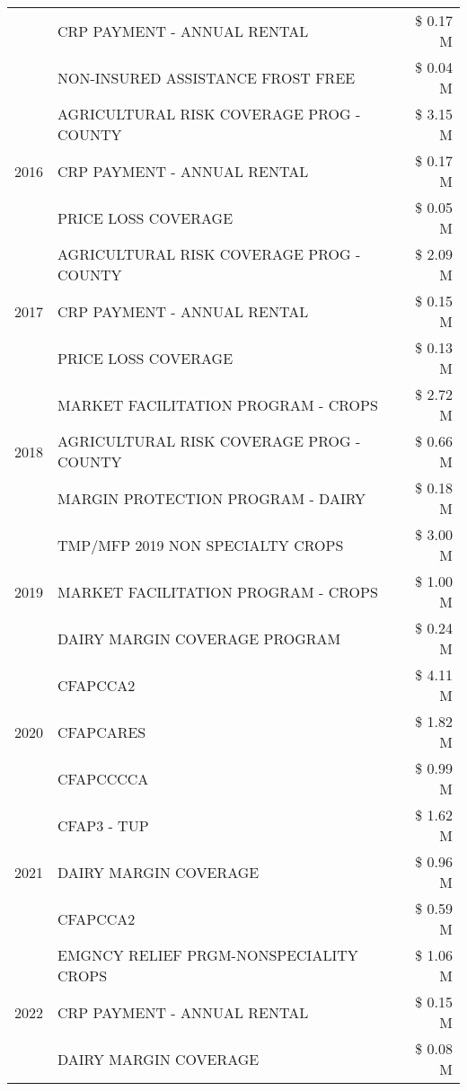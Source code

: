 \begin{tabular}{llr}
 & CRP PAYMENT - ANNUAL RENTAL & \$ 0.17 M \\
 & NON-INSURED ASSISTANCE FROST FREE & \$ 0.04 M \\
\cline{1-3}
\multirow[t]{3}{*}{2016} & AGRICULTURAL RISK COVERAGE PROG - COUNTY & \$ 3.15 M \\
 & CRP PAYMENT - ANNUAL RENTAL & \$ 0.17 M \\
 & PRICE LOSS COVERAGE & \$ 0.05 M \\
\cline{1-3}
\multirow[t]{3}{*}{2017} & AGRICULTURAL RISK COVERAGE PROG - COUNTY & \$ 2.09 M \\
 & CRP PAYMENT - ANNUAL RENTAL & \$ 0.15 M \\
 & PRICE LOSS COVERAGE & \$ 0.13 M \\
\cline{1-3}
\multirow[t]{3}{*}{2018} & MARKET FACILITATION PROGRAM - CROPS & \$ 2.72 M \\
 & AGRICULTURAL RISK COVERAGE PROG - COUNTY & \$ 0.66 M \\
 & MARGIN PROTECTION PROGRAM - DAIRY & \$ 0.18 M \\
\cline{1-3}
\multirow[t]{3}{*}{2019} & TMP/MFP 2019 NON SPECIALTY CROPS & \$ 3.00 M \\
 & MARKET FACILITATION PROGRAM - CROPS & \$ 1.00 M \\
 & DAIRY MARGIN COVERAGE PROGRAM & \$ 0.24 M \\
\cline{1-3}
\multirow[t]{3}{*}{2020} & CFAPCCA2 & \$ 4.11 M \\
 & CFAPCARES & \$ 1.82 M \\
 & CFAPCCCCA & \$ 0.99 M \\
\cline{1-3}
\multirow[t]{3}{*}{2021} & CFAP3 - TUP & \$ 1.62 M \\
 & DAIRY MARGIN COVERAGE & \$ 0.96 M \\
 & CFAPCCA2 & \$ 0.59 M \\
\cline{1-3}
\multirow[t]{3}{*}{2022} & EMGNCY RELIEF PRGM-NONSPECIALITY CROPS & \$ 1.06 M \\
 & CRP PAYMENT - ANNUAL RENTAL & \$ 0.15 M \\
 & DAIRY MARGIN COVERAGE & \$ 0.08 M \\
\cline{1-3}
\bottomrule
\end{tabular}
